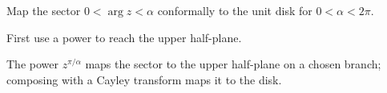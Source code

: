 \begin{exercise}\label{exr:iv17-expand-16}
Map the sector \(0<\arg z<\alpha\) conformally to the unit disk for \(0<\alpha<2\pi\).
\end{exercise}
\begin{hint}
First use a power to reach the upper half-plane.
\end{hint}
\begin{solution}
The power \(z^{\pi/\alpha}\) maps the sector to the upper half-plane on a chosen branch; composing with a Cayley transform maps it to the disk.
\end{solution}


